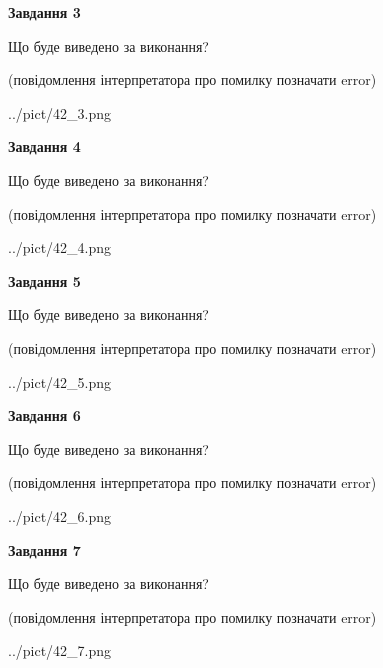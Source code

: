 \documentclass[12pt, ukrainian]{article}
\begin{document}
{\begin {large}
{\begin {center}\textbf{Завдання 3}\end {center}}\par
Що буде виведено за виконання?\par
 (повідомлення інтерпретатора про помилку позначати error)\par
\begin{center}
	{../pict/42_3.png}
\end{center}
\newpage

{\begin {center}\textbf{Завдання 4}\end {center}}\par
Що буде виведено за виконання?\par
 (повідомлення інтерпретатора про помилку позначати error)\par
\begin{center}
	{../pict/42_4.png}
\end{center}
\newpage

{\begin {center}\textbf{Завдання 5}\end {center}}\par
Що буде виведено за виконання?\par
 (повідомлення інтерпретатора про помилку позначати error)\par
\begin{center}
	{../pict/42_5.png}
\end{center}
\newpage

{\begin {center}\textbf{Завдання 6}\end {center}}\par
Що буде виведено за виконання?\par
 (повідомлення інтерпретатора про помилку позначати error)\par
\begin{center}
	{../pict/42_6.png}
\end{center}
\newpage

{\begin {center}\textbf{Завдання 7}\end {center}}\par
Що буде виведено за виконання?\par
 (повідомлення інтерпретатора про помилку позначати error)\par
\begin{center}
	{../pict/42_7.png}
\end{center}
\newpage


\end{large}}
\end{document}
